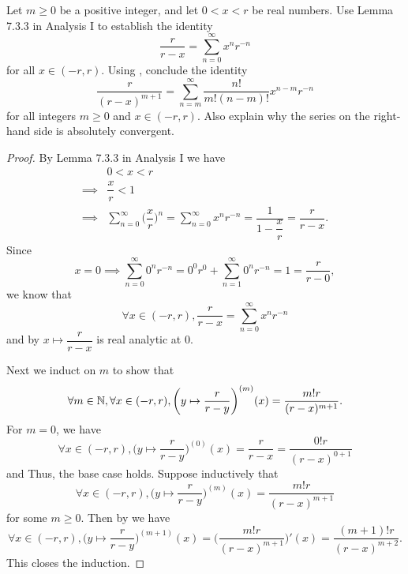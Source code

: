 \begin{ex}\label{ii:ex:4.2.7}
  Let \(m \geq 0\) be a positive integer, and let \(0 < x < r\) be real numbers.
  Use Lemma 7.3.3 in Analysis I to establish the identity
  \[
    \dfrac{r}{r - x} = \sum_{n = 0}^\infty x^n r^{-n}
  \]
  for all \(x \in (-r, r)\).
  Using , conclude the identity
  \[
    \dfrac{r}{(r - x)^{m + 1}} = \sum_{n = m}^\infty \dfrac{n!}{m! (n - m)!} x^{n - m} r^{-n}
  \]
  for all integers \(m \geq 0\) and \(x \in (-r, r)\).
  Also explain why the series on the right-hand side is absolutely convergent.
\end{ex}

\begin{proof}
  By Lemma 7.3.3 in Analysis I we have
  \begin{align*}
             & 0 < x < r                                                                                                                         \\
    \implies & \dfrac{x}{r} < 1                                                                                                                  \\
    \implies & \sum_{n = 0}^\infty \bigg(\dfrac{x}{r}\bigg)^n = \sum_{n = 0}^\infty x^n r^{-n} = \dfrac{1}{1 - \dfrac{x}{r}} = \dfrac{r}{r - x}.
  \end{align*}
  Since
  \[
    x = 0 \implies \sum_{n = 0}^\infty 0^n r^{-n} = 0^0 r^{0} + \sum_{n = 1}^\infty 0^n r^{-n} = 1 = \dfrac{r}{r - 0},
  \]
  we know that
  \[
    \forall x \in (-r, r), \dfrac{r}{r - x} = \sum_{n = 0}^\infty x^n r^{-n}
  \]
  and by  \(x \mapsto \dfrac{r}{r - x}\) is real analytic at \(0\).

  Next we induct on \(m\) to show that
  \[
    \forall m \in \mathbb{N}, \forall x \in (-r, r), \bigg(y \mapsto \dfrac{r}{r - y}\bigg)^{(m)}(x) = \dfrac{m! r}{(r - x)^{m + 1}}.
  \]
  For \(m = 0\), we have
  \[
    \forall x \in (-r, r), \bigg(y \mapsto \dfrac{r}{r - y}\bigg)^{(0)}(x) = \dfrac{r}{r - x} = \dfrac{0! r}{(r - x)^{0 + 1}}
  \]
  and Thus, the base case holds.
  Suppose inductively that
  \[
    \forall x \in (-r, r), \bigg(y \mapsto \dfrac{r}{r - y}\bigg)^{(m)}(x) = \dfrac{m! r}{(r - x)^{m + 1}}
  \]
  for some \(m \geq 0\).
  Then by  we have
  \[
    \forall x \in (-r, r), \bigg(y \mapsto \dfrac{r}{r - y}\bigg)^{(m + 1)}(x) = \bigg(\dfrac{m! r}{(r - x)^{m + 1}}\bigg)'(x) = \dfrac{(m + 1)! r}{(r - x)^{m + 2}}.
  \]
  This closes the induction.


\end{proof}
